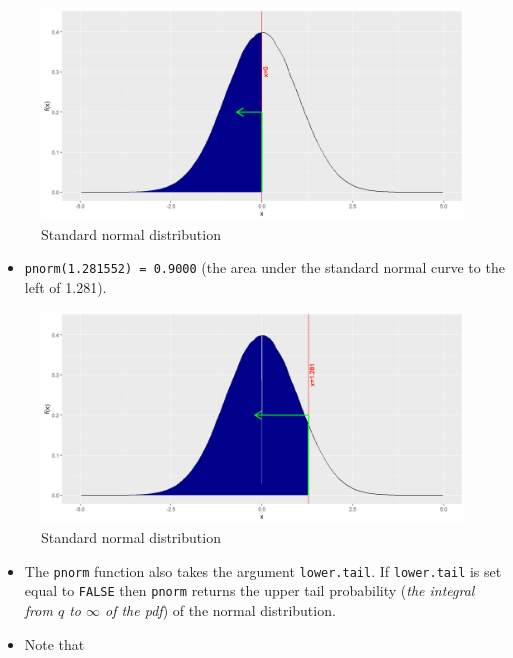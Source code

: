 \documentclass[
]{book}
\providecommand{\tightlist}{%
  \setlength{\itemsep}{0pt}\setlength{\parskip}{0pt}}
\begin{document}
\begin{figure}

{\centering \includegraphics{figure/norm1-1} 

}

\caption{Standard normal distribution}\label{fig:norm1}
\end{figure}

\begin{itemize}
\tightlist
\item
  \texttt{pnorm(1.281552)\ =\ 0.9000} (the area under the standard normal curve to the left of 1.281).
\end{itemize}

\begin{figure}

{\centering \includegraphics{figure/norm2-1} 

}

\caption{Standard normal distribution}\label{fig:norm2}
\end{figure}

\begin{itemize}
\item
  The \texttt{pnorm} function also takes the argument \texttt{lower.tail}. If \texttt{lower.tail} is set equal to \texttt{FALSE} then \texttt{pnorm} returns the upper tail probability (\emph{the integral from \(q\) to \(\infty\) of the pdf}) of the normal distribution.
\item
  Note that
\end{itemize}
\end{document}
